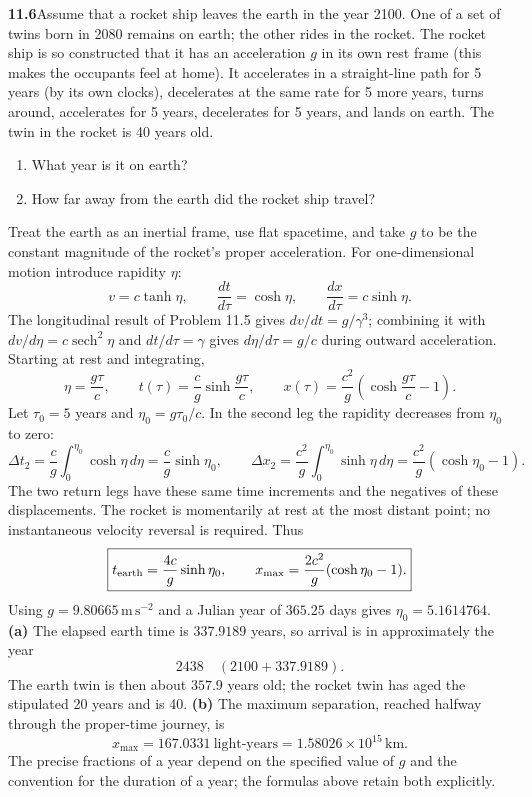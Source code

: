 \par\bigskip
\noindent\textbf{11.6}\quad Assume that a rocket ship leaves the earth in the year 2100. One of a set of twins born in 2080 remains on earth; the other rides in the rocket. The rocket ship is so constructed that it has an acceleration $g$ in its own rest frame (this makes the occupants feel at home). It accelerates in a straight-line path for 5 years (by its own clocks), decelerates at the same rate for 5 more years, turns around, accelerates for 5 years, decelerates for 5 years, and lands on earth. The twin in the rocket is 40 years old.
\begin{enumerate}
\item[(a)] What year is it on earth?
\item[(b)] How far away from the earth did the rocket ship travel?
\end{enumerate}
\solution
Treat the earth as an inertial frame, use flat spacetime, and take
$g$ to be the constant magnitude of the rocket's proper acceleration.
For one-dimensional motion introduce rapidity $\eta$:
\[
v=c\tanh\eta,\qquad \frac{dt}{d\tau}=\cosh\eta,
\qquad\frac{dx}{d\tau}=c\sinh\eta.
\]
The longitudinal result of Problem 11.5 gives $dv/dt=g/\gamma^3$;
combining it with $dv/d\eta=c\operatorname{sech}^2\eta$ and
$dt/d\tau=\gamma$ gives $d\eta/d\tau=g/c$ during outward acceleration.
Starting at rest and integrating,
\[
\eta=\frac{g\tau}{c},\qquad
 t(\tau)=\frac cg\sinh\frac{g\tau}{c},\qquad
 x(\tau)=\frac{c^2}{g}\left(\cosh\frac{g\tau}{c}-1\right).
\]
Let $\tau_0=5$ years and $\eta_0=g\tau_0/c$.
In the second leg the rapidity decreases from $\eta_0$ to zero:
\[
\Delta t_2=\frac cg\int_0^{\eta_0}\cosh\eta\,d\eta
=\frac cg\sinh\eta_0,\qquad
\Delta x_2=\frac{c^2}g\int_0^{\eta_0}\sinh\eta\,d\eta
=\frac{c^2}g(\cosh\eta_0-1).
\]
The two return legs have these same time increments and the negatives
of these displacements. The rocket is momentarily at rest at the
most distant point; no instantaneous velocity reversal is required.
Thus
\[
\boxed{t_{\rm earth}=\frac{4c}{g}\sinh\eta_0,\qquad
x_{\max}=\frac{2c^2}{g}(\cosh\eta_0-1).}
\]
Using $g=9.80665\,\mathrm{m\,s^{-2}}$ and a Julian year of
$365.25$ days gives $\eta_0=5.1614764$.
\textbf{(a)} The elapsed earth time is $337.9189$ years, so arrival
is in approximately the year
\[
\boxed{2438\quad(2100+337.9189).}
\]
The earth twin is then about $357.9$ years old; the rocket twin has
aged the stipulated 20 years and is 40.
\textbf{(b)} The maximum separation, reached halfway through the
proper-time journey, is
\[
\boxed{x_{\max}=167.0331\ \text{light-years}
=1.58026\times10^{15}\,\mathrm{km}.}
\]
The precise fractions of a year depend on the specified value of
$g$ and the convention for the duration of a year; the formulas
above retain both explicitly.

